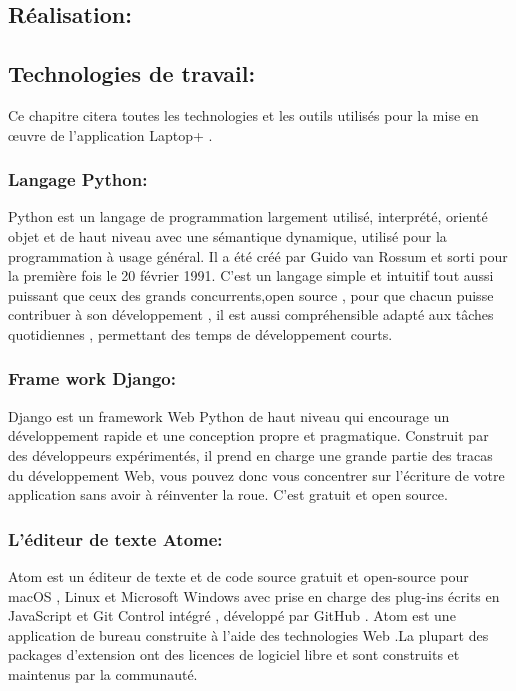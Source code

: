 \documentclass[a4paper]{report}
\begin{document}
\begin{doublespace}
	\chapter{Réalisation:}
	\fancyhead[L]{\hspace*{5cm}}


	\section{Technologies de travail:}
	Ce chapitre citera toutes les technologies et les
	outils utilisés pour la mise en œuvre de l'application Laptop+ .
	\subsection{Langage Python:}
	\begin{figure}[H]
		\raggedleft{
		}
	\end{figure}
	Python est un langage de programmation largement
	utilisé, interprété, orienté objet et de haut niveau avec une sémantique
	dynamique, utilisé pour la programmation à usage général. Il a été créé par
	Guido van Rossum et sorti pour la première fois le 20 février 1991. C'est un
	langage simple et intuitif tout aussi puissant que ceux des grands
	concurrents,open source , pour que chacun puisse contribuer à son développement
	, il est aussi compréhensible
	adapté aux tâches quotidiennes , permettant des temps
	de développement courts.

	\newpage

	\subsection{Frame work Django:}
	\begin{figure}[H]
		\raggedleft{
		}
	\end{figure}
	Django est un framework Web Python de haut niveau qui
	encourage un développement rapide et une conception propre et pragmatique.
	Construit par des développeurs expérimentés, il prend en charge une grande
	partie des tracas du développement Web, vous pouvez donc vous concentrer sur
	l'écriture de votre application sans avoir à réinventer la roue. C'est gratuit
	et open source.

	\subsection{L'éditeur de texte Atome:}
	\begin{figure}[H]
		\raggedleft{
		}
	\end{figure}
	Atom est un éditeur de texte et de code source gratuit
	et open-source pour macOS , Linux et Microsoft Windows avec prise en charge des
	plug-ins écrits en JavaScript et Git Control intégré , développé par GitHub .
	Atom est une application de bureau construite à l'aide des technologies Web .La
	plupart des packages d'extension ont des licences de logiciel libre et sont
	construits et maintenus par la communauté.
	\newpage

\end{doublespace}
\end{document}
